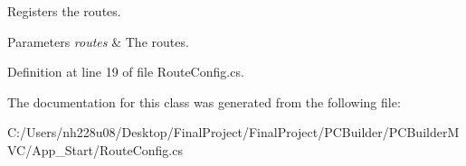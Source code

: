 Registers the routes. 


\begin{DoxyParams}{Parameters}
{\em routes} & The routes.\\
\hline
\end{DoxyParams}


Definition at line 19 of file Route\+Config.\+cs.



The documentation for this class was generated from the following file\+:\begin{DoxyCompactItemize}
\item 
C\+:/\+Users/nh228u08/\+Desktop/\+Final\+Project/\+Final\+Project/\+P\+C\+Builder/\+P\+C\+Builder\+M\+V\+C/\+App\+\_\+\+Start/Route\+Config.\+cs\end{DoxyCompactItemize}
